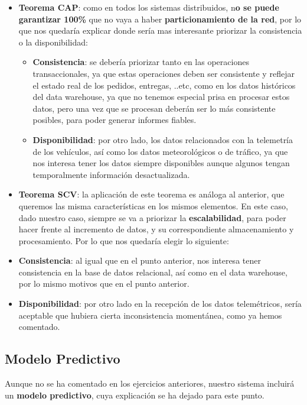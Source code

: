 \begin{itemize}
	\item \textbf{Teorema CAP}: como en todos los sistemas distribuidos, n\textbf{o se puede garantizar 100\%} que no vaya a haber \textbf{particionamiento de la red}, por lo que nos quedaría explicar donde sería mas interesante priorizar la consistencia o la disponibilidad:
	\begin{itemize}
		\item \textbf{Consistencia}: se debería priorizar tanto en las operaciones transaccionales, ya que estas operaciones deben ser consistente y reflejar el estado real de los pedidos, entregas, ..etc, como en los datos históricos del data warehouse, ya que no tenemos especial prisa en procesar estos datos, pero una vez que se procesan deberán ser lo más consistente posibles, para poder generar informes fiables.
		
		\item \textbf{Disponibilidad}: por otro lado, los datos relacionados con la telemetría de los vehículos, así como los datos meteorológicos o de tráfico, ya que nos interesa tener los datos siempre disponibles aunque algunos tengan temporalmente información desactualizada.
	\end{itemize} 
	
	\item \textbf{Teorema SCV}: la aplicación de este teorema es análoga al anterior, que queremos las misma características en los mismos elementos. En este caso, dado nuestro caso, siempre se va a priorizar la \textbf{escalabilidad}, para poder hacer frente al incremento de datos, y su correspondiente almacenamiento y procesamiento. Por lo que nos quedaría elegir lo siguiente:
	
	\item \textbf{Consistencia}: al igual que en el punto anterior, nos interesa tener consistencia en la base de datos relacional, así como en el data warehouse, por lo mismo motivos que en el punto anterior.
	
	\item \textbf{Disponibilidad}: por otro lado en la recepción de los datos telemétricos, sería aceptable que hubiera cierta inconsistencia momentánea, como ya hemos comentado.
\end{itemize}


\subsection{Modelo Predictivo}
Aunque no se ha comentado en los ejercicios anteriores, nuestro sistema incluirá un \textbf{modelo predictivo}, cuya explicación se ha dejado para este punto. 

